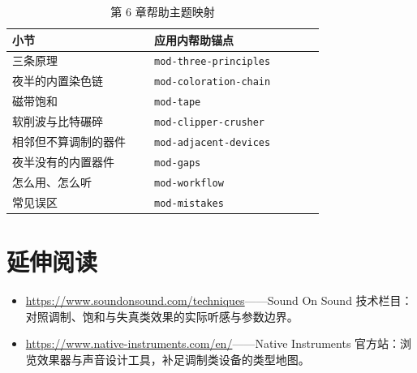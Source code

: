 \begin{table}[htbp]
\centering
\small
\begin{tabular}{@{}p{0.40\linewidth}p{0.48\linewidth}@{}}
\hline
小节 & 应用内帮助锚点 \\
\hline
三条原理 & \texttt{mod-three-principles} \\
夜半的内置染色链 & \texttt{mod-coloration-chain} \\
磁带饱和 & \texttt{mod-tape} \\
软削波与比特碾碎 & \texttt{mod-clipper-crusher} \\
相邻但不算调制的器件 & \texttt{mod-adjacent-devices} \\
夜半没有的内置器件 & \texttt{mod-gaps} \\
怎么用、怎么听 & \texttt{mod-workflow} \\
常见误区 & \texttt{mod-mistakes} \\
\hline
\end{tabular}
\caption{第 6 章帮助主题映射}
\end{table}

\section*{延伸阅读}
\begin{itemize}[leftmargin=1.5em]
\item \url{https://www.soundonsound.com/techniques}——Sound On Sound 技术栏目：对照调制、饱和与失真类效果的实际听感与参数边界。
\item \url{https://www.native-instruments.com/en/}——Native Instruments 官方站：浏览效果器与声音设计工具，补足调制类设备的类型地图。
\end{itemize}
